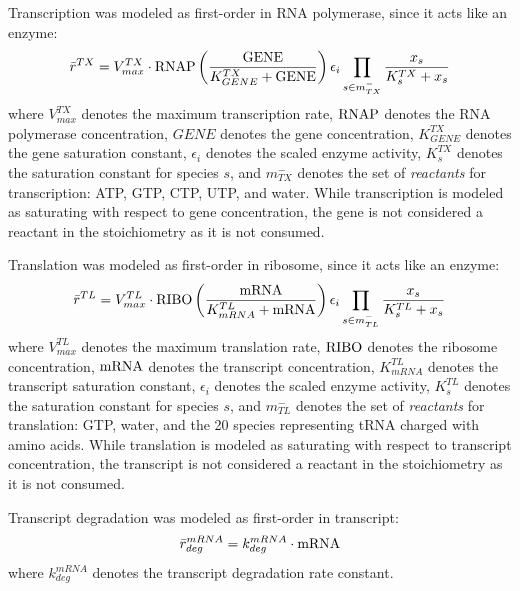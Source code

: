 \documentclass[12pt]{article}
\begin{document}
Transcription was modeled as first-order in RNA polymerase, since it acts like an enzyme:
\begin{equation}\label{eqn:transcription}
    \bar{r}^{TX} = V_{max}^{TX}\cdot{\rm RNAP}\left(\frac{{\rm GENE}}{K_{GENE}^{TX}+{\rm GENE}}\right)\epsilon_{i}\prod_{s\in{m_{TX}^{-}}}\frac{x_{s}}{K_{s}^{TX}+x_{s}}
\end{equation}
where $V_{max}^{TX}$ denotes the maximum transcription rate, ${\rm RNAP}$ denotes the RNA polymerase concentration, $GENE$ denotes the gene concentration, $K_{GENE}^{TX}$ denotes the gene saturation constant, $\epsilon_{i}$ denotes the scaled enzyme activity, $K_{s}^{TX}$ denotes the saturation constant for species $s$, and $m_{TX}^{-}$ denotes the set of \textit{reactants} for transcription: ATP, GTP, CTP, UTP, and water.
While transcription is modeled as saturating with respect to gene concentration, the gene is not considered a reactant in the stoichiometry as it is not consumed.

Translation was modeled as first-order in ribosome, since it acts like an enzyme:
\begin{equation}\label{eqn:translation}
    \bar{r}^{TL} = V_{max}^{TL}\cdot{\rm RIBO}\left(\frac{{\rm mRNA}}{K_{mRNA}^{TL}+{\rm mRNA}}\right)\epsilon_{i}\prod_{s\in{m_{TL}^{-}}}\frac{x_{s}}{K_{s}^{TL}+x_{s}}
\end{equation}
where $V_{max}^{TL}$ denotes the maximum translation rate, ${\rm RIBO}$ denotes the ribosome concentration, ${\rm mRNA}$ denotes the transcript concentration, $K_{mRNA}^{TL}$ denotes the transcript saturation constant, $\epsilon_{i}$ denotes the scaled enzyme activity, $K_{s}^{TL}$ denotes the saturation constant for species $s$, and $m_{TL}^{-}$ denotes the set of \textit{reactants} for translation: GTP, water, and the 20 species representing tRNA charged with amino acids.
While translation is modeled as saturating with respect to transcript concentration, the transcript is not considered a reactant in the stoichiometry as it is not consumed.

Transcript degradation was modeled as first-order in transcript:
\begin{equation}\label{eqn:mRNA_degradation}
    \bar{r}_{deg}^{mRNA} = k_{deg}^{mRNA}\cdot{\rm mRNA}
\end{equation}
where $k_{deg}^{mRNA}$ denotes the transcript degradation rate constant.
\end{document}
